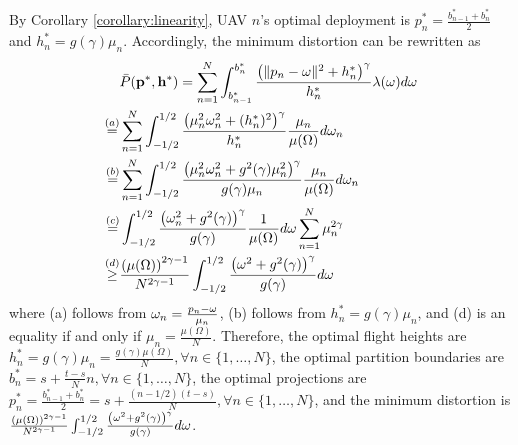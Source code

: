 \documentclass[smallabstract,smallcaptions]{dccpaper}
\newcommand{\df}{\ensuremath{\lam}}         %
\newcommand{\bP}{\ensuremath{\vp}}          %
\newcommand{\abPo}{\ensuremath{\bar{P}}}  %
\newcommand{\bH}{\ensuremath{\vh}}          %
\newcommand{\Vor}{\ensuremath{\mathcal{V}}}         %
\newcommand{\philippstart}{\color{black}}
\newcommand{\philippend}{\color{black}}
\newcommand{\junend}{\color{black}}
\begin{document}
By Corollary \ref{corollary:linearity}, UAV $n$'s optimal deployment is $p^*_n=\frac{b^*_{n-1}+b^*_{n}}{2}$ and $h^*_n=g(\gamma)\mu_n$.
Accordingly, the minimum distortion can be rewritten as
\begin{align}
    &\abPo(\bP^*,\bH^*)=\sum_{n=1}^{N}\int_{b^*_{n-1}}^{b^*_{n}}\frac{\left(\|p_n-\ome\|^2+h^*_n\right)^{\gamma}}{h^*_n}\df(\ome) d\ome\\
    \overset{(a)}{=}&\sum_{n=1}^{N}\int_{-1/2}^{1/2} \frac{\left(\mu^2_n\ome^2_n+(h^*_n)^2\right)^{\gamma}}{h^*_n} \frac{\mu_n}{\mu(\Omega)}d\ome_n\\
    \overset{(b)}{=}&\sum_{n=1}^{N}\int_{-1/2}^{1/2}\frac{\left(\mu^2_n\ome^2_n+g^2(\gamma)\mu^2_n\right)^{\gamma}}{g(\gamma)\mu_n} \frac{\mu_n}{\mu(\Omega)}d\ome_n\\
    \overset{(c)}{=}&\int_{-1/2}^{1/2}\frac{\left(\ome^2_n+g^2(\gamma)\right)^{\gamma}}{g(\gamma)} \frac{1}{\mu(\Omega)}d\ome\sum_{n=1}^{N}\mu^{2\gamma}_n\\
    \overset{(d)}{\ge}&\frac{\left(\mu(\Omega)\right)^{2\gamma-1}}{N^{2\gamma-1}}\int_{-1/2}^{1/2}\frac{\left(\ome^2+g^2(\gamma)\right)^{\gamma}}{g(\gamma)} d\ome
  \end{align}
where (a) follows from $\omega_n=\frac{p_n-\omega}{\mu_n}$, (b) follows from $h^*_n=g(\gamma)\mu_n$, and (d) is an equality if and only if $\mu_n=\frac{\mu(\Omega)}{N}$.
Therefore, the optimal flight heights are $h^*_n=g(\gamma)\mu_n=\frac{g(\gamma)\mu(\Omega)}{N}, \forall n\in\{1,\dots,N\}$, the optimal partition boundaries are $b^*_n=s+\frac{t-s}{N}n, \forall n\in\{1,\dots,N\}$, the optimal projections are $p^*_n=\frac{b^*_{n-1}+b^*_{n}}{2}=s+\frac{(n-1/2)(t-s)}{N}, \forall n\in\{1,\dots,N\}$, and the minimum distortion is $\frac{\left(\mu(\Omega)\right)^{2\gamma-1}}{N^{2\gamma-1}}\int_{-1/2}^{1/2}\frac{\left(\omega^2+g^2(\gamma)\right)^{\gamma}}{g(\gamma)} d\omega$.
\fi
\junend
\philippstart

\philippend
%
%
\printbibliography
\end{document}
